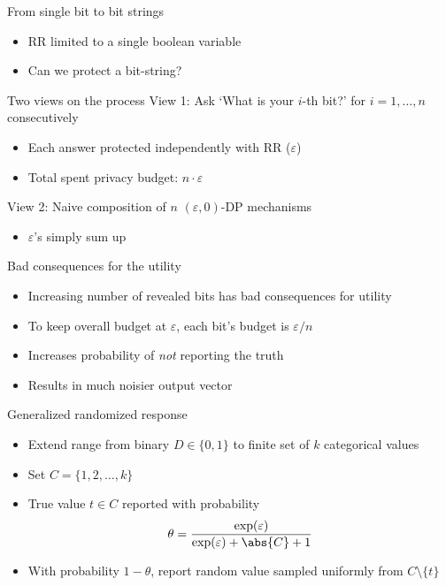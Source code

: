 \documentclass[12pt,aspectratio=169,handout]{beamer}
\begin{document}
\begin{frame}{From single bit to bit strings}
\begin{itemize}
\item RR limited to a single boolean variable
\item Can we protect a bit-string?
\end{itemize}

\begin{block}{Two views on the process}
View 1: Ask `What is your $i$-th bit?' for $i = 1, \ldots, n$ consecutively
\begin{itemize}
\item Each answer protected independently with RR ($\varepsilon$)
\item Total spent privacy budget: $n \cdot \varepsilon$
\end{itemize}
View 2: Naive composition of $n$ $(\varepsilon, 0)$-DP mechanisms
\begin{itemize}
\item $\varepsilon$'s simply sum up
\end{itemize}
\end{block}
\end{frame}

\begin{frame}{Bad consequences for the utility}
\begin{itemize}
\item Increasing number of revealed bits has bad consequences for utility
\item To keep overall budget at $\varepsilon$, each bit's budget is $\varepsilon/n$
\item Increases probability of \emph{not} reporting the truth
\item Results in much noisier output vector
\end{itemize}
\end{frame}


 
\begin{frame}{Generalized randomized response}
\begin{itemize}
\item Extend range from binary $D \in \{0, 1\}$ to finite set of $k$ categorical values
\item Set $C = \{1, 2, \ldots, k\}$
\item True value $t \in C$ reported with probability
$$
\theta = \frac{\exp(\varepsilon)}{\exp(\varepsilon) + \abs{C} + 1}
$$
\item With probability $1 - \theta$, report random value sampled uniformly from $C \setminus \{t\}$
\end{itemize}
\end{frame}
\end{document}
